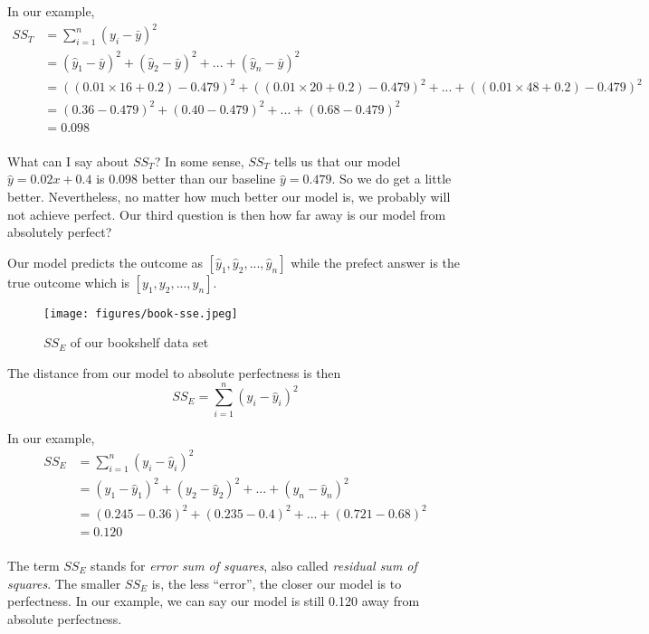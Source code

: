 \documentclass[
	letterpaper
]{article}
\begin{document}
In our example,
\begin{equation}
\begin{split}
SS_T &= \sum_{i = 1}^n (y_i - \bar y) ^2 \\
& = (\hat y_1 - \bar y) ^2 + (\hat y_2 - \bar y) ^2 + ... + (\hat y_n - \bar y) ^2\\
& = ((0.01\times 16 +0.2) - 0.479) ^2 + ((0.01\times 20 +0.2) - 0.479) ^2 + ... + ((0.01\times 48 +0.2) - 0.479) ^2\\
& = (0.36 - 0.479) ^2 + (0.40 - 0.479) ^2 + ... + (0.68 - 0.479) ^2\\
& = 0.098\\
\end{split}
\end{equation}

What can I say about $SS_T$?
In some sense, $SS_T$ tells us that our model ${\hat y} = 0.02 x + 0.4$ is 0.098 better than our baseline ${\hat y} = 0.479$.
So we do get a little better.
Nevertheless, no matter how much better our model is, we probably will not achieve perfect. 
Our third question is then how far away is our model from absolutely perfect?

Our model predicts the outcome as $[\hat y_1, \hat y_2, ..., \hat y_n]$ while the prefect answer is the true outcome which is $[y_1, y_2, ..., y_n]$.
\begin{figure}[htbp]
	\centering
	\texttt{[image: figures/book-sse.jpeg]}
	\caption{$SS_E$ of our bookshelf data set}
	\label{fig:book-sse}
\end{figure}

The distance from our model to absolute perfectness is then
\begin{equation}
SS_E = \sum_{i = 1}^n (y_i - \hat y_i) ^2 
\end{equation}

In our example,
\begin{equation}
\begin{split}
SS_E & = \sum_{i = 1}^n (y_i - \hat y_i) ^2 \\
& = (y_1 - \hat y_1) ^2 + (y_2 - \hat y_2) ^2 + ... + (y_n - \hat y_n) ^2\\
& = (0.245-0.36) ^2 + (0.235-0.4) ^2 + ... + (0.721-0.68) ^2\\
& = 0.120\\
\end{split}
\end{equation}


The term $SS_E$ stands for \textit{error sum of squares}, also called \textit{residual sum of squares}. 
The smaller $SS_E$ is, the less ``error'', the closer our model is to perfectness.
In our example, we can say our model is still 0.120 away from absolute perfectness.
\end{document}
